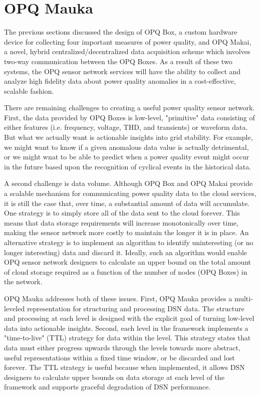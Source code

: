 \section{OPQ Mauka}
\label{sec:opq-mauka}

The previous sections discussed the design of OPQ Box, a custom hardware device for collecting four important measures of power quality, and OPQ Makai, a novel, hybrid centralized/decentralized data acquisition scheme which involves two-way communication between the OPQ Boxes.  As a result of these two systems, the OPQ sensor network services will have the ability to collect and analyze high fidelity data about power quality anomalies in a cost-effective, scalable fashion.

There are remaining challenges to creating a useful power quality sensor network. First, the data provided by OPQ Boxes is low-level, "primitive" data consisting of either features (i.e. frequency, voltage, THD, and transients) or waveform data. But what we actually want is actionable insights into grid stability. For example, we might want to know if a given anomalous data value is actually detrimental, or we might wnat to be able to predict when a power quality event might occur in the future based upon the recognition of cyclical events in the historical data.

A second challenge is data volume. Although OPQ Box and OPQ Makai provide a scalable mechanism for communicating power quality data to the cloud services, it is still the case that, over time, a substantial amount of data will accumulate. One strategy is to simply store all of the data sent to the cloud forever. This means that data storage requirements will increase monotonically over time, making the sensor network more costly to maintain the longer it is in place. An alternative strategy is to implement an algorithm to identify uninteresting (or no longer interesting) data and discard it.  Ideally, such an algorithm would enable OPQ sensor network designers to calculate an upper bound on the total amount of cloud storage required as a function of the number of nodes (OPQ Boxes) in the network.

OPQ Mauka addresses both of these issues. First, OPQ Mauka provides a multi-leveled representation for structuring and processing DSN data. The structure and processing at each level is designed with the explicit goal of turning low-level data into actionable insights. Second, each level in the framework implements a "time-to-live" (TTL) strategy for data within the level. This strategy states that data must either progress upwards through the levels towards more abstract, useful representations within a fixed time window, or be discarded and lost forever. The TTL strategy is useful because when implemented, it allows DSN designers to calculate upper bounds on data storage at each level of the framework and supports graceful degradation of DSN performance.